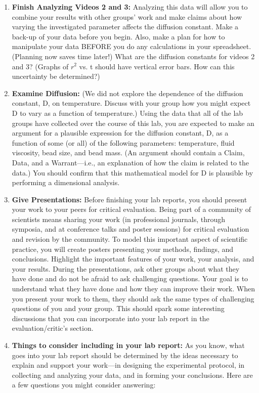 \begin{enumerate}
\item \textbf{Finish Analyzing Videos 2 and 3:} Analyzing this data will allow you to combine your results with other groups' work and make claims about how varying the investigated parameter affects the diffusion constant. Make a back-up of your data before you begin. Also, make a plan for how to manipulate your data BEFORE you do any calculations in your spreadsheet. (Planning now saves time later!) What are the diffusion constants for videos 2 and 3? (Graphs of $r^{2}$ vs. t should have vertical error bars. How can this uncertainty be determined?)
\item \textbf{Examine Diffusion:} (We did not explore the dependence of the diffusion constant, D, on temperature. Discuss with your group how you might expect D to vary as a function of temperature.) Using the data that all of the lab groups have collected over the course of this lab, you are expected to make an argument for a plausible expression for the diffusion constant, D, as a function of some (or all) of the following parameters: temperature, fluid viscosity, bead size, and bead mass. (An argument should contain a Claim, Data, and a Warrant—i.e., an explanation of how the claim is related to the data.) You should confirm that this mathematical model for D is plausible by performing a dimensional analysis.
\item \textbf{Give Presentations:} Before finishing your lab reports, you should present your work to your peers for critical evaluation. Being part of a community of scientists means sharing your work (in professional journals, through symposia, and at conference talks and poster sessions) for critical evaluation and revision by the community. To model this important aspect of scientific practice, you will create posters presenting your methods, findings, and conclusions. Highlight the important features of your work, your analysis, and your results. During the presentations, ask other groups about what they have done and do not be afraid to ask challenging questions. Your goal is to understand what they have done and how they can improve their work. When you present your work to them, they should ask the same types of challenging questions of you and your group. This should spark some interesting discussions that you can incorporate into your lab report in the evaluation/critic's section.
\item \textbf{Things to consider including in your lab report:} As you know, what goes into your lab report should be determined by the ideas necessary to explain and support your work—in designing the experimental protocol, in collecting and analyzing your data, and in forming your conclusions. Here are a few questions you might consider answering:

\end{enumerate}
